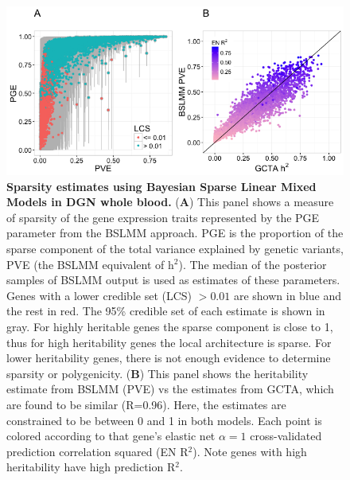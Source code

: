 \documentclass[10pt,letterpaper]{article}
\begin{document}
\begin{figure}[H]
\includegraphics[width=12cm]{Figures/Fig-DGN-BSLMM.png}
\caption{{\bf Sparsity estimates using Bayesian Sparse Linear Mixed Models in DGN whole blood.} 
(\textbf{A}) This panel shows a measure of sparsity of the gene expression traits represented by the PGE parameter from the BSLMM approach. PGE is the proportion of the sparse component of the total variance explained by genetic variants, PVE (the BSLMM equivalent of h$^2$). The median of the posterior samples of BSLMM output is used as estimates of these parameters.
Genes with a lower credible set (LCS) $>0.01$ are shown in blue and the rest in red. The 95\% credible set of each estimate is shown in gray. 
 For highly heritable genes the sparse component is close to 1, thus for high heritability genes the local architecture is sparse. For lower heritability genes, there is not enough evidence to determine sparsity or polygenicity. (\textbf{B}) This panel shows the heritability estimate from BSLMM (PVE) vs the estimates from GCTA, which are found to be similar (R=0.96). Here, the estimates are constrained to be between 0 and 1 in both models. Each point is colored according to that gene's elastic net \(\alpha=1\) cross-validated prediction correlation squared (EN R$^2$). Note genes with high heritability have high prediction R$^2$.
%
}
\label{fig-dgn-bslmm}
\end{figure}
\end{document}
